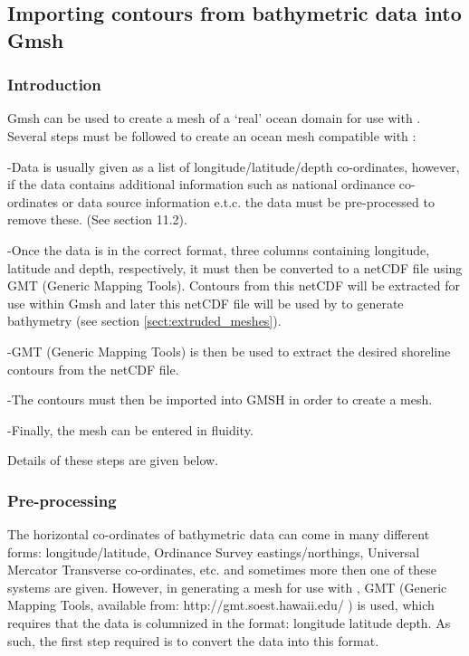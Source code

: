 \subsection{Importing contours from bathymetric data into Gmsh}

\subsubsection{Introduction}

Gmsh can be used to create a mesh of a `real' ocean domain for use with \fluidity. Several steps must be followed
to create an ocean mesh compatible with \fluidity:

-Data is usually given as a list of longitude/latitude/depth co-ordinates, however, if the data 
contains additional information such as national ordinance co-ordinates or data source information e.t.c. 
the data must be pre-processed to remove these. (See section 11.2). 

-Once the data is in the correct format, three columns containing longitude, latitude and depth, respectively, 
it must then be converted to a netCDF file using GMT (Generic Mapping Tools). Contours from this netCDF will be
extracted for use within Gmsh and later this netCDF file will be used by \fluidity to generate bathymetry
(see section \ref{sect:extruded_meshes}).

-GMT (Generic Mapping Tools) is then be used to extract the desired shoreline contours from the netCDF file. 

-The contours must then be imported into GMSH in order to create a mesh.

-Finally, the mesh can be entered in fluidity.

Details of these steps are given below.

\subsubsection{Pre-processing}

The horizontal co-ordinates of bathymetric data can come in many different forms: 
longitude/latitude, Ordinance Survey eastings/northings, Universal Mercator Transverse 
co-ordinates, etc. and sometimes more then one of these systems are given. However, 
in generating a mesh for use with \fluidity,
GMT (Generic Mapping Tools, available from: http://gmt.soest.hawaii.edu/ ) is used, which requires 
that the data is columnized in the format: longitude latitude depth. As such, the first step 
required is to convert the data into this format.

